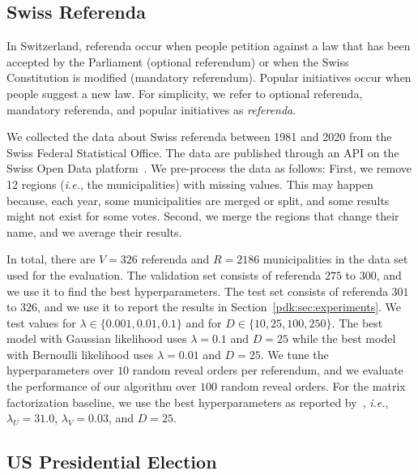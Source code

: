 \subsection{Swiss Referenda}%
\label{app:ch}

In Switzerland, referenda occur when  people petition against a law that has been accepted by the Parliament (optional referendum) or when the Swiss Constitution is modified (mandatory referendum).
Popular initiatives occur when  people suggest a new law.
For simplicity, we refer to optional referenda, mandatory referenda, and popular initiatives as \textit{referenda}.

We collected the data about Swiss referenda between 1981 and 2020 from the Swiss Federal Statistical Office.
The data are published through an API on the Swiss Open Data platform~\citep{confederation2020open}.
We pre-process the data as follows:
First, we remove 12 regions (\textit{i.e.}, the municipalities) with missing values.
This may happen because, each year, some municipalities are merged or split, and some results might not exist for some votes.
Second, we merge the regions that change their name, and we average their results.

In total, there are $V=326$ referenda and $R=2186$ municipalities in the data set used for the evaluation.
The validation set consists of referenda $275$ to $300$, and we use it to find the best hyperparameters.
The test set consists of referenda $301$ to $326$, and we use it to report the results in Section~\ref{pdk:sec:experiments}.
We test values for $\lambda \in \{0.001, 0.01, 0.1\}$ and for $D \in \{10, 25, 100, 250\}$.
The best model with Gaussian likelihood uses $\lambda=0.1$ and $D=25$ while the best model with Bernoulli likelihood uses $\lambda=0.01$ and $D=25$.
We tune the hyperparameters over $10$ random reveal orders per referendum, and we evaluate the performance of our algorithm over $100$ random reveal orders.
For the matrix factorization baseline, we use the best hyperparameters as reported by~\citet{etter2016online}, \textit{i.e.}, $\lambda_U = 31.0$, $\lambda_V = 0.03$, and $D = 25$.

\subsection{US Presidential Election}%
\label{app:us}

